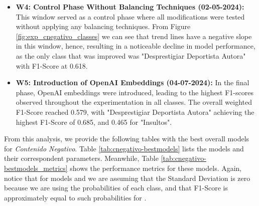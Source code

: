 \begin{itemize}
    \item \textbf{W4: Control Phase Without Balancing Techniques (02-05-2024):} This window served as a control phase where all modifications were tested without applying any balancing techniques. From Figure \ref{fig:exp_cnegativo_classes} we can see that trend lines have a negative slope in this window, hence, resulting in a noticeable decline in model performance, as the only class that was improved was "Desprestigiar Deportista Autora" with F1-Score at 0.618.

    \item \textbf{W5: Introduction of OpenAI Embeddings (04-07-2024):} In the final phase, OpenAI embeddings were introduced, leading to the highest F1-scores observed throughout the experimentation in all classes. The overall weighted F1-Score reached 0.579, with "Desprestigiar Deportista Autora" achieving the highest F1-Score of 0.685, and 0.465 for "Insultos".


\end{itemize}

From this analysis, we provide the following tables with the best overall models for \textit{Contenido Negativo}. Table \ref{tab:cnegativo-bestmodels} lists the models and their correspondent parameters. Meanwhile, Table \ref{tab:cnegativo-bestmodels_metrics} shows the performance metrics for these models. Again, notice that for models {\cnegmajor} and {\cnegrandom} we are assuming that the Standard Deviation is zero because we are using the probabilities of each class, and that F1-Score is approximately equal to such probabilities for {\cnegrandom}.

